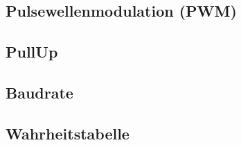 \subsection{Pulsewellenmodulation (PWM)}
\label{subsec:pulsewellenmodulation-(pwm)}

\subsection{PullUp}
\label{subsec:pullup}

\subsection{Baudrate}
\label{subsec:baudrate}

\subsection{Wahrheitstabelle}
\label{subsec:wahrheitstabelle}
